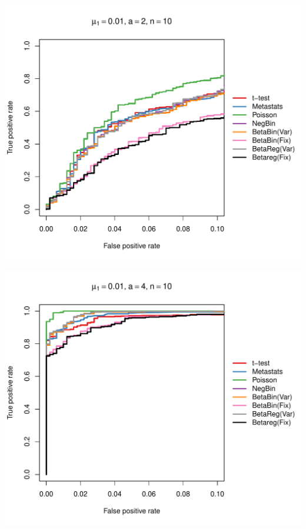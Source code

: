 \documentclass[12pt]{article}\usepackage{graphicx, color}
\makeatletter
\def\maxwidth{ %
  \ifdim\Gin@nat@width>\linewidth
    \linewidth
  \else
    \Gin@nat@width
  \fi
}
\newenvironment{knitrout}{}{} %
\makeatother
\begin{document}
\begin{knitrout}
{\centering \includegraphics[width=\maxwidth]{figure/rocs59} 

}




{\centering \includegraphics[width=\maxwidth]{figure/rocs60} 

}





\end{knitrout}
\end{document}
